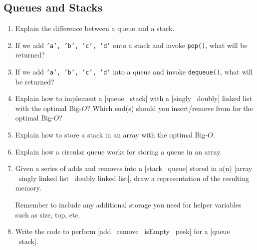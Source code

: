 \documentclass[10pt]{article}
\begin{document}
\subsection{Queues and Stacks}
\begin{enumerate}[leftmargin=0em]\addtocounter{enumi}{17}
    \item Explain the difference between a queue and a stack.
    \item If we add \texttt{'a', 'b', 'c', 'd'} onto a stack and invoke \texttt{pop()}, what will be returned? 
    \item If we add \texttt{'a', 'b', 'c', 'd'} into a queue and invoke \texttt{dequeue()}, what will be returned?
    \item Explain how to implement a [queue \vline\ stack] with a [singly \vline\ doubly] linked list with the optimal Big-$O$? Which end(s) should you insert/remove from for the optimal Big-$O$?
    \item Explain how to store a stack in an array with the optimal Big-$O$.
    \item Explain how a circular queue works for storing a queue in an array.
    \item Given a series of adds and removes into a [stack \vline\ queue] stored in a(n) [array \vline\ singly linked list \vline\ doubly linked list], draw a representation of the resulting memory.
    
    Remember to include any additional storage you need for helper variables such as size, top, etc.
    \item Write the code to perform [add \vline\ remove \vline\ isEmpty \vline\ peek] for a [queue \vline\ stack].
\end{enumerate}
\end{document}
